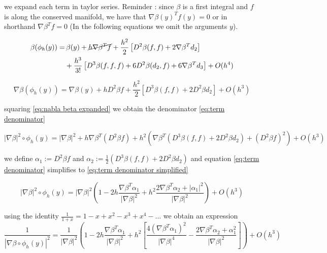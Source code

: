 \documentclass[12pt]{article}
\begin{document}
we expand each term in taylor series. Reminder : since $\beta$ is a first integral and $f$ is along the conserved manifold, we have that $\nabla\beta(y)^T f(y) = 0$ or in shorthand $\nabla\beta^Tf =0$ (In the following equations we omit the arguments $y$). 

\begin{equation}\label{eq:term 1 e}
\begin{split}
    \beta(\phi_h(y)) = & \, \beta(y) + \cancel{h\nabla\beta^T f} + \frac{h^2}{2}\left[ D^2\beta(f,f) + 2\nabla\beta^T d_2 \right]\\
    & + \frac{h^3}{3!}\left[ D^3\beta(f,f,f) + 6D^2\beta(d_2,f) + 6\nabla\beta^T d_3 \right] + O(h^4)
\end{split}
\end{equation}

\begin{equation}\label{eq:nabla beta expanded} 
    \nabla\beta(\phi_h(y)) = \nabla\beta(y) + hD^2\beta f + \frac{h^2}{2}\left[ D^3\beta(f,f) + 2 D^2\beta d_2 \right] + O(h^3) 
\end{equation} 

squaring \eqref{eq:nabla beta expanded} we obtain the denominator \eqref{eq:term denominator}

\begin{equation}\label{eq:term denominator}
    |\nabla\beta|^2 \circ \phi_h(y) = |\nabla\beta|^2 + h \nabla\beta^T \left(D^2\beta f\right) +
    h^2\left(\nabla\beta^T\left( D^3\beta(f,f) + 2 D^2\beta d_2  \right) + \left( D^2\beta f \right)^2\right) + O(h^3)
\end{equation}

we define $\alpha_1 := D^2\beta f$ and $\alpha_2 := \frac{1}{2}\left( D^3\beta(f,f) + 2 D^2\beta d_2 \right)$ and equation \eqref{eq:term denominator} simplifies to \eqref{eq:term denominator simplified}

\begin{equation}\label{eq:term denominator simplified}
    |\nabla\beta|^2 \circ \phi_h(y) = |\nabla\beta|^2 \left( 1 - 2h\frac{\nabla\beta^T\alpha_1}{|\nabla\beta|^2} + h^2\frac{2\nabla\beta^T\alpha_2 + |\alpha_1|^2}{|\nabla\beta|^2} \right) + O(h^3)
\end{equation}

using the identity $\frac{1}{1+x} = 1 - x + x^2 - x^3 + x^4 - ...$ we obtain an expression
\begin{equation}\label{eq:term denominator expansion}
    \frac{1}{|\nabla\beta\circ\phi_h(y)|^2} = \frac{1}{|\nabla\beta|^2}\left(
    1 - 2h\frac{\nabla\beta^T\alpha_1}{|\nabla\beta|^2} + h^2\left[ \frac{4\left( \nabla\beta^T\alpha_1\right)^2}{|\nabla\beta|^4} - \frac{2\nabla\beta^T\alpha_2 + \alpha_1^2}{|\nabla\beta|^2} \right]
    \right) + O(h^3)
\end{equation}
\end{document}
